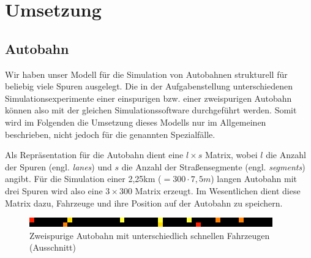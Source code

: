 \documentclass[11pt, a4paper]{article}
\begin{document}

\newpage
\section{Umsetzung}
\label{sec:umsetzung}

\subsection{Autobahn}
\label{subsec:umsetzung-autobahn}

Wir haben unser Modell für die Simulation von Autobahnen strukturell für beliebig viele Spuren ausgelegt. Die in der Aufgabenstellung unterschiedenen Simulationsexperimente einer einspurigen bzw. einer zweispurigen Autobahn können also mit der gleichen Simulationssoftware durchgeführt werden. Somit wird im Folgenden die Umsetzung dieses Modells nur im Allgemeinen beschrieben, nicht jedoch für die genannten Spezialfälle.

Als Repräsentation für die Autobahn dient eine $l \times s$ Matrix, wobei $l$ die Anzahl der Spuren (engl. \emph{lanes}) und $s$ die Anzahl der Straßensegmente (engl. \emph{segments}) angibt. Für die Simulation einer 2,25km ($= 300 \cdot 7,5m$) langen Autobahn mit drei Spuren wird also eine $3 \times 300$ Matrix erzeugt. Im Wesentlichen dient diese Matrix dazu, Fahrzeuge und ihre Position auf der Autobahn zu speichern.\\

\begin{figure}[h!]
	\centering
	\includegraphics{img/twoLaneRoad}
	\caption{Zweispurige Autobahn mit unterschiedlich schnellen Fahrzeugen (Ausschnitt)}
	\label{fig:twoLaneRoad}
\end{figure}
\end{document}

